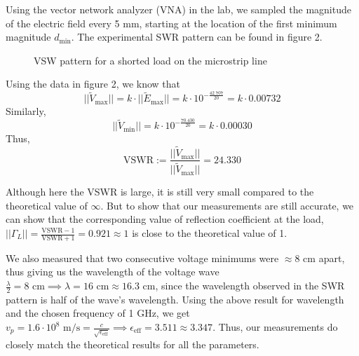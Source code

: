 \documentclass[10pt]{article}
\begin{document}
Using the vector network analyzer (VNA) in the lab, we sampled the magnitude of the electric field every 5 mm, starting at 
the location of the first minimum magnitude $d_\text{min}$. The experimental SWR pattern can be found in figure 2.

\begin{figure}[ht]
  \centering
  \caption{VSW pattern for a shorted load on the microstrip line\vspace{-0.3cm}}
  \label{VNA_log_mag_shorted}
\end{figure}

Using the data in figure 2, we know that
\[||\tilde V_\text{max}|| = k\cdot ||\tilde E_\text{max}|| = k\cdot 10^{-\frac{42.707}{20}} = k\cdot 0.00732\]
Similarly,
  \[ || \tilde V_\text{min}|| = k\cdot 10^{-\frac{70.430}{20}} = k\cdot 0.00030\]
Thus,
  \[\text{VSWR} := \frac{||\tilde V_\text{max}||}{||\tilde V_\text{max}||} = 24.330\]

Although here the VSWR is large, it is still very small compared to the theoretical value of $\infty$. But to
show that our measurements are still accurate, we can show that the corresponding value of reflection coefficient
at the load, $||\Gamma_L|| = \frac{\text{VSWR}-1}{\text{VSWR}+1} = 0.921 \approx 1$ is close to the theoretical value of 1.

We also measured that two consecutive voltage minimums were $\approx 8 \text{ cm}$ apart, thus giving us the wavelength 
of the voltage wave $\frac{\lambda}{2} = 8\text{ cm} \implies \lambda = 16\text{ cm} \approx 16.3\text{ cm}$, since the wavelength 
observed in the SWR pattern is half of the wave's wavelength. Using the above result for wavelength and the chosen frequency of 1 GHz, we get 
$v_p = 1.6\cdot10^8 \text{ m/s} = \frac{c}{\sqrt{\epsilon_\text{eff}}} \implies \epsilon_\text{eff} = 3.511 \approx 3.347$. 
Thus, our measurements do closely match the theoretical results for all the parameters.
\end{document}
